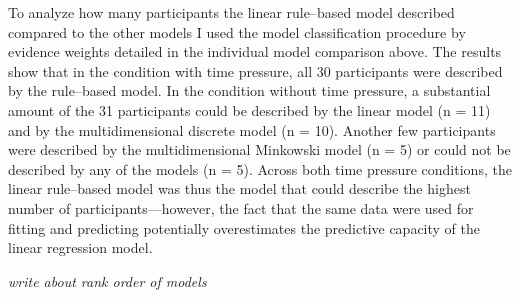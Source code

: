 \documentclass[a4paper,man,natbib]{apa6}
\begin{document}
To analyze how many participants the linear rule--based model described compared to the other models I used the model classification procedure by evidence weights detailed in the individual model comparison above. The results show that in the condition with time pressure, all 30 participants were described by the rule--based model. In the condition without time pressure, a substantial amount of the 31 participants could be described by the linear model (n = 11) and by the multidimensional discrete model (n = 10). Another few participants were described by the multidimensional Minkowski model (n = 5) or could not be described by any of the models (n = 5). Across both time pressure conditions, the linear rule--based model was thus the model that could describe the highest number of participants---however, the fact that the same data were used for fitting and predicting potentially overestimates the predictive capacity of the linear regression model. 


\textit{write about rank order of models}
\end{document}
